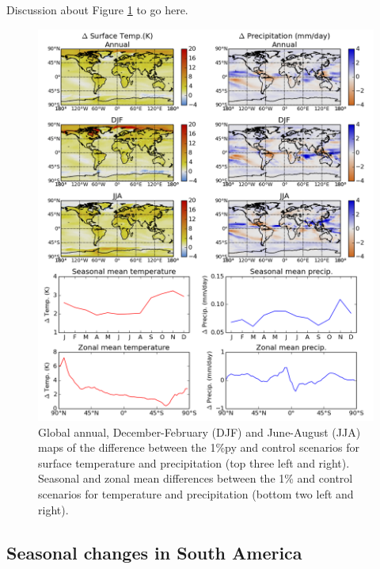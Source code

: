 \documentclass{article}
\begin{document}
Discussion about Figure \ref{fig:global_temp_precip} to go here.




\begin{figure}[hbp]
    \centering
    \includegraphics[width=\textwidth]{figures/global_temp_precip}
    \caption{Global annual, December-February (DJF) and June-August (JJA) maps of the difference between the 1\%py and control scenarios for surface temperature and precipitation (top three left and right). Seasonal and zonal mean differences between the 1\% and control scenarios for temperature and precipitation (bottom two left and right).}
    \label{fig:global_temp_precip}
\end{figure}

\newpage
\subsection{Seasonal changes in South America}
\end{document}
